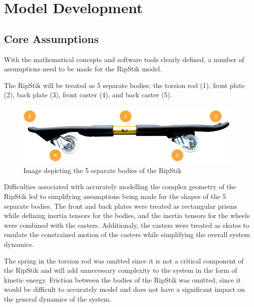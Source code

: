 \documentclass[12pt,letterpaper]{article}
\begin{document}
\section{Model Development}

\subsection{Core Assumptions}

With the mathematical concepts and software tools clearly defined, a number of assumptions need to be made for the RipStik model.
\par
The RipStik will be treated as 5 separate bodies; the torsion rod (1), front plate (2), back plate (3), front caster (4), and back caster (5).

\begin{figure}[!htb]
	\centering
	\includegraphics[width=\linewidth]{RipStikModel}
	\caption{Image depicting the 5 separate bodies of the RipStik}\label{fig:RipStikModel}
	\endminipage
\end{figure}  

Difficulties associated with accurately modelling the complex geometry of the RipStik led to simplifying assumptions being made for the shapes of the 5 separate bodies.
The front and back plates were treated as rectangular prisms while defining inertia tensors for the bodies, and the inertia tensors for the wheels were combined with the casters. 
Additionaly, the casters were treated as skates to emulate the constrained motion of the casters while simplifying the overall system dynamics.
\par
The spring in the torsion rod was omitted since it is not a critical component of the RipStik and will add unnecessary complexity to the system in the form of kinetic energy.
Friction between the bodies of the RipStik was omitted, since it would be difficult to accurately model and does not have a significant impact on the general dynamics of the system.
 
\end{document}
